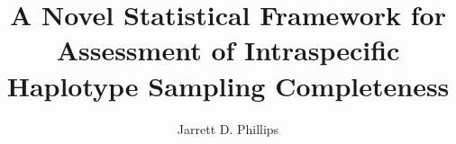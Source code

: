  
\title{\textbf{A Novel Statistical Framework for Assessment of Intraspecific Haplotype Sampling Completeness}}
\author{Jarrett D. Phillips}
%
%
%
\maketitle
